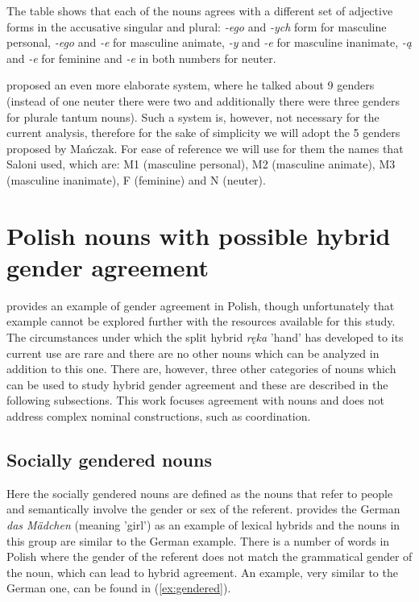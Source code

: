The table shows that each of the nouns agrees with a different set of adjective forms in the accusative singular and plural: \textsl{-ego} and \textsl{-ych} form for masculine personal, \textsl{-ego} and \textsl{-e} for masculine animate, \textsl{-y} and \textsl{-e} for masculine inanimate, \textsl{-ą} and \textsl{-e} for feminine and \textsl{-e} in both numbers for neuter.

\cite{saloni_kategoria_1976} proposed an even more elaborate system, where he talked about 9 genders (instead of one neuter there were two and additionally there were three genders for plurale tantum nouns). Such a system is, however, not necessary for the current analysis, therefore for the sake of simplicity we will adopt the 5 genders proposed by Mańczak. For ease of reference we will use for them the names that Saloni used, which are: M1 (masculine personal), M2 (masculine animate), M3 (masculine inanimate), F (feminine) and N (neuter).

\section{Polish nouns with possible hybrid gender agreement}
\cite{corbett_agreement_2023} provides an example of gender agreement in Polish, though unfortunately that example cannot be explored further with the resources available for this study. The circumstances under which the split hybrid \textsl{ręka} 'hand' has developed to its current use are rare and there are no other nouns which can be analyzed in addition to this one. There are, however, three other categories of nouns which can be used to study hybrid gender agreement and these are described in the following subsections. This work focuses agreement with nouns and does not address complex nominal constructions, such as coordination.

\subsection{Socially gendered nouns}
Here the socially gendered nouns are defined as the nouns that refer to people and semantically involve the gender or sex of the referent. \cite{corbett_agreement_2023} provides the German \textsl{das M{\"a}dchen} (meaning 'girl') as an example of lexical hybrids and the nouns in this group are similar to the German example. There is a number of words in Polish where the gender of the referent does not match the grammatical gender of the noun, which can lead to hybrid agreement. An example, very similar to the German one, can be found in (\ref{ex:gendered}). 


